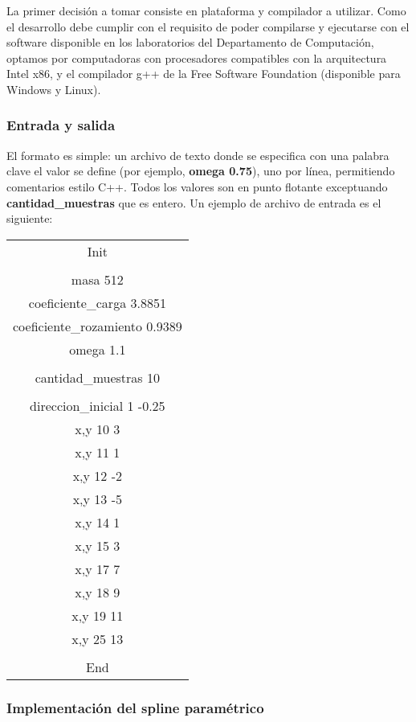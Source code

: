 		La primer decisi\'on a tomar consiste en plataforma y compilador a utilizar. Como el desarrollo debe cumplir con el requisito de poder compilarse y ejecutarse con el software disponible en los laboratorios del Departamento de Computaci\'on, optamos por computadoras con procesadores compatibles con la arquitectura Intel x86, y el compilador g++ de la Free Software Foundation (disponible para Windows y Linux).

		\subsubsection{Entrada y salida}

		El formato es simple: un archivo de texto donde se especifica con una palabra clave el valor se define (por ejemplo, \textbf{omega 0.75}), uno por l\'inea, permitiendo comentarios estilo C++.
		Todos los valores son en punto flotante exceptuando \textbf{cantidad\_muestras} que es entero.
		Un ejemplo de archivo de entrada es el siguiente:

\begin{center}
	\begin{tabular}{|c|}
	\hline
Init\\
\\
masa 512\\
coeficiente\_carga 3.8851\\
coeficiente\_rozamiento 0.9389\\
omega 1.1\\
\\
cantidad\_muestras 10\\
\\
direccion\_inicial 1 -0.25\\
x,y 10 3\\
x,y 11 1\\
x,y 12 -2\\
x,y 13 -5\\
x,y 14 1\\
x,y 15 3\\
x,y 17 7\\
x,y 18 9\\
x,y 19 11\\
x,y 25 13\\
\\
End\\
	\hline
	\end{tabular}
\end{center}
		

\subsubsection{Implementaci\'on del spline param\'etrico}

